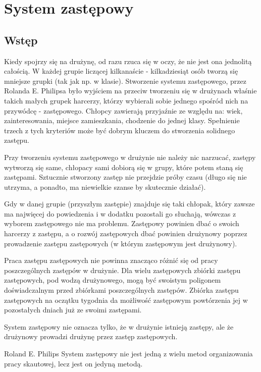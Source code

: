 \chapter{System zastępowy}
\section{Wstęp}
Kiedy  spojrzy się na  drużynę, od  razu rzuca  się w  oczy,  że nie jest ona jednolitą całością. 
W każdej grupie liczącej kilkanaście - kilkadziesiąt osób tworzą się  mniejsze  grupki (tak jak np. w  klasie). 
Stworzenie systemu zastępowego, przez Rolanda E. Philipsa było wyjściem na przeciw tworzeniu  się w drużynach właśnie takich małych grupek harcerzy, którzy wybierali sobie jednego spośród nich na przywódcę - zastępowego. 
Chłopcy zawierają  przyjaźnie  ze względu na: wiek, zainteresowania,  miejsce  zamieszkania, chodzenie do jednej klasy. Spełnienie trzech z tych kryteriów może być dobrym kluczem  do stworzenia  solidnego zastępu. 
	
Przy tworzeniu systemu zastępowego w drużynie nie należy nic narzucać, zastępy wytworzą się same, chłopacy sami dobiorą się w grupy, które potem staną  się zastępami. Sztucznie stworzony zastęp nie przejdzie próby czasu (długo się nie utrzyma, a ponadto, ma niewielkie szanse by skutecznie działać).

Gdy w danej grupie (przyszłym  zastępie)  znajduje  się  taki chłopak, który  zawsze ma najwięcej do powiedzenia  i  w  dodatku  pozostali  go  słuchają, wówczas z wyborem zastępowego nie ma problemu. 
Zastępowy powinien dbać o swoich harcerzy z zastępu,  a o rozwój zastępowych dbać powinien drużynowy poprzez prowadzenie zastępu zastępowych (w którym zastępowym jest drużynowy).

Praca zastępu zastępowych  nie powinna znacząco różnić się od pracy poszczególnych zastępów  w  drużynie. Dla wielu zastępowych zbiórki zastępu zastępowych, pod wodzą  drużynowego, mogą być swoistym poligonem doświadczalnym przed zbiórkami  poszczególnych zastępów. Zbiórka zastępu zastępowych na  oczątku tygodnia da możliwość zastępowym powtórzenia jej w  pozostałych dniach już ze  swoimi  zastępami.

System zastępowy nie oznacza tylko, że w drużynie istnieją zastępy, ale że drużynowy prowadzi drużynę przez zastęp zastępowych.

\begin{aquote}{Roland E. Philips}
  System  zastępowy  nie  jest  jedną  z  wielu  metod organizowania  pracy  skautowej, lecz jest  on  jedyną  metodą.
 \end{aquote}
 
